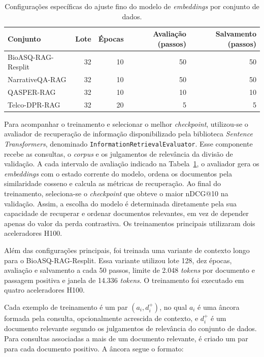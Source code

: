 \begin{table}[htbp]
\caption{Configurações específicas do ajuste fino do modelo de \textit{embeddings} por conjunto de dados.}
\label{tab:config-ft-ctx-embedding-datasets}
\centering
\footnotesize
\begin{tabular}{lrrrr}
\hline
\textbf{Conjunto} &
\textbf{Lote} &
\textbf{Épocas} &
\textbf{Avaliação (passos)} &
\textbf{Salvamento (passos)} \\ \hline
BioASQ-RAG-Resplit & 32 & 10 & 50 & 50 \\
NarrativeQA-RAG & 32 & 10 & 50 & 50 \\
QASPER-RAG & 32 & 10 & 10 & 10 \\
Telco-DPR-RAG & 32 & 20 & 5 & 5 \\ \hline
\end{tabular}
\end{table}

Para acompanhar o treinamento e selecionar o melhor \textit{checkpoint}, utilizou-se o avaliador de recuperação de informação disponibilizado pela biblioteca \textit{Sentence Transformers}, denominado \texttt{InformationRetrievalEvaluator}. Esse componente recebe as consultas, o \textit{corpus} e os julgamentos de relevância da divisão de validação. A cada intervalo de avaliação indicado na Tabela~\ref{tab:config-ft-ctx-embedding-datasets}, o avaliador gera os \textit{embeddings} com o estado corrente do modelo, ordena os documentos pela similaridade cosseno e calcula as métricas de recuperação. Ao final do treinamento, seleciona-se o \textit{checkpoint} que obteve o maior nDCG@10 na validação. Assim, a escolha do modelo é determinada diretamente pela sua capacidade de recuperar e ordenar documentos relevantes, em vez de depender apenas do valor da perda contrastiva. Os treinamentos principais utilizaram dois aceleradores H100.

Além das configurações principais, foi treinada uma variante de contexto longo para o BioASQ-RAG-Resplit. Essa variante utilizou lote 128, dez épocas, avaliação e salvamento a cada 50 passos, limite de 2.048 \textit{tokens} por documento e passagem positiva e janela de 14.336 \textit{tokens}. O treinamento foi executado em quatro aceleradores H100.

Cada exemplo de treinamento é um par $(a_i,d_i^{+})$, no qual $a_i$ é uma âncora formada pela consulta, opcionalmente acrescida de contexto, e $d_i^{+}$ é um documento relevante segundo os julgamentos de relevância do conjunto de dados. Para consultas associadas a mais de um documento relevante, é criado um par para cada documento positivo. A âncora segue o formato:

